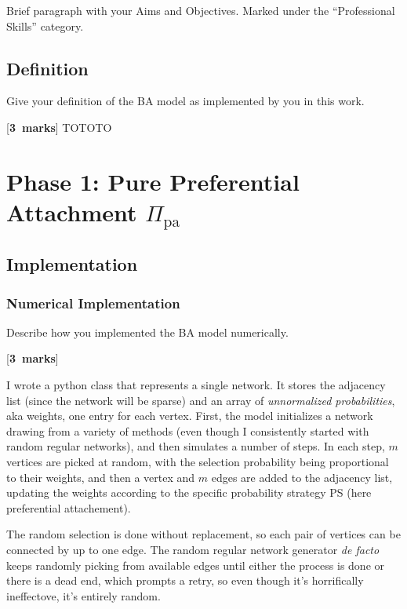 \documentclass[a4paper,12pt]{article}
\newcounter{nmarks}
\newcommand{\qmarks}[1]{\addtocounter{nmarks}{#1} }
\renewcommand{\qmarks}[1]{\addtocounter{nmarks}{#1} \hspace*{\fill} [\textbf{#1~marks}]}
\begin{document}
Brief paragraph with your Aims and Objectives. Marked under the ``Professional Skills'' category.

\subsection*{Definition}

Give your definition of the BA model as implemented by you in this work. \qmarks{3} TOTOTO


\section{Phase 1: Pure Preferential Attachment $\Pi_\mathrm{pa}$}

\subsection{Implementation}



\subsubsection{Numerical Implementation}
Describe how you implemented the BA model numerically. \qmarks{3} %

I wrote a python class that represents a single network. It stores the adjacency list (since the network will be sparse) and an array of \textit{unnormalized probabilities}, aka weights, one entry for each vertex. First, the model initializes a network drawing from a variety of methods (even though I consistently started with random regular networks), and then simulates a number of steps. In each step, $m$ vertices are picked at random, with the selection probability being proportional to their weights, and then a vertex and $m$ edges are added to the adjacency list, updating the weights according to the specific probability strategy PS (here preferential attachement).

The random selection is done without replacement, so each pair of vertices can be connected by up to one edge. The random regular network generator \textit{de facto} keeps randomly picking from available edges until either the process is done or there is a dead end, which prompts a retry, so even though it's horrifically ineffectove, it's entirely random.
\end{document}
